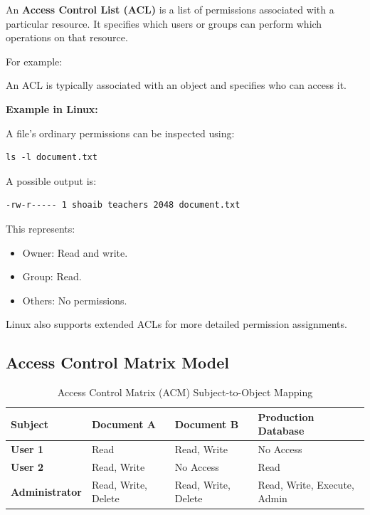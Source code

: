 An \textbf{Access Control List (ACL)} is a list of permissions associated with a particular resource. It specifies which users or groups can perform which operations on that resource.

For example:


An ACL is typically associated with an object and specifies who can access it.

\textbf{Example in Linux:}

A file's ordinary permissions can be inspected using:

\begin{lstlisting}
ls -l document.txt
\end{lstlisting}

A possible output is:

\begin{lstlisting}
-rw-r----- 1 shoaib teachers 2048 document.txt
\end{lstlisting}

This represents:

\begin{itemize}
\item Owner: Read and write.
\item Group: Read.
\item Others: No permissions.
\end{itemize}

Linux also supports extended ACLs for more detailed permission assignments.

\subsection{Access Control Matrix Model}

\begin{table}[htbp]
\centering
\caption{Access Control Matrix (ACM) Subject-to-Object Mapping}
\label{tab:access_control_matrix}
\begin{tabularx}{\textwidth}{p{2.5cm} p{3.2cm} p{3.2cm} X}
\toprule
\textbf{Subject} & \textbf{Document A} & \textbf{Document B} & \textbf{Production Database} \\
\midrule
\textbf{User 1} & Read & Read, Write & No Access \\
\textbf{User 2} & Read, Write & No Access & Read \\
\textbf{Administrator} & Read, Write, Delete & Read, Write, Delete & Read, Write, Execute, Admin \\
\bottomrule
\end{tabularx}
\end{table}

